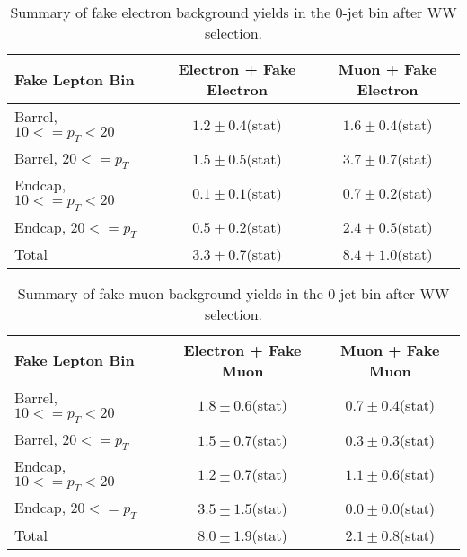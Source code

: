 \begin{table}[!htbp]
\begin{center}
\begin{tabular}{|l|c|c|}
\hline
Fake Lepton Bin               & Electron + Fake Electron & Muon + Fake Electron  \\
\hline
Barrel, $10 <= p_{T} < 20$    &  $1.2 \pm 0.4$(stat)     &   $1.6 \pm 0.4$(stat) \\
Barrel, $20 <= p_{T} $        &  $1.5 \pm 0.5$(stat)     &   $3.7 \pm 0.7$(stat) \\
Endcap, $10 <= p_{T} < 20$    &  $0.1 \pm 0.1$(stat)     &   $0.7 \pm 0.2$(stat) \\
Endcap, $20 <= p_{T} $        &  $0.5 \pm 0.2$(stat)     &   $2.4 \pm 0.5$(stat) \\
\hline
Total                         &  $3.3  \pm 0.7$(stat)    &   $8.4 \pm 1.0$(stat) \\
\hline
\end{tabular}
\caption{Summary of fake electron background yields in the 0-jet bin after WW selection. }
\label{tab:FakeElectronBkgPrediction_WWSelection_0JetBin}
\end{center}
\end{table}

\begin{table}[!htbp]
\begin{center}
\begin{tabular}{|l|c|c|}
\hline
Fake Lepton Bin               & Electron + Fake Muon & Muon + Fake Muon  \\
\hline
Barrel, $10 <= p_{T} < 20$    &  $1.8 \pm 0.6$(stat)     &   $0.7 \pm 0.4$(stat) \\
Barrel, $20 <= p_{T} $        &  $1.5 \pm 0.7$(stat)     &   $0.3 \pm 0.3$(stat) \\
Endcap, $10 <= p_{T} < 20$    &  $1.2 \pm 0.7$(stat)     &   $1.1 \pm 0.6$(stat) \\
Endcap, $20 <= p_{T} $        &  $3.5 \pm 1.5$(stat)     &   $0.0 \pm 0.0$(stat) \\
\hline
Total                         &  $8.0  \pm 1.9$(stat)    &   $2.1 \pm 0.8$(stat) \\
\hline
\end{tabular}
\caption{Summary of fake muon background yields in the 0-jet bin after WW selection. }
\label{tab:FakeElectronBkgPrediction_WWSelection_0JetBin}
\end{center}
\end{table}



